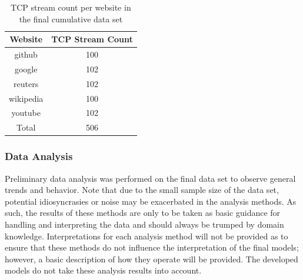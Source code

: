 \documentclass[10pt,sigconf,letterpaper,nonacm]{acmart}
\begin{document}
\begin{table}
  \caption{TCP stream count per website in the final cumulative data set}
  \label{tab:dataSize}
  \begin{tabular}{cc}
    \toprule
    Website & TCP Stream Count \\
    \midrule
    github & 100 \\
    google & 102 \\
    reuters & 102 \\
    wikipedia & 100 \\
    youtube & 102 \\
    \midrule
    Total & 506 \\
    \bottomrule
  \end{tabular}
\end{table}

\subsubsection{Data Analysis}

Preliminary data analysis was performed on the final data set to observe general trends and behavior.
Note that due to the small sample size of the data set, potential idiosyncrasies or noise may be exacerbated in the analysis methods.
As such, the results of these methods are only to be taken as basic guidance for handling and interpreting the data and should always be trumped by domain knowledge.
Interpretations for each analysis method will not be provided as to ensure that these methods do not influence the interpretation of the final models; however, a basic description of how they operate will be provided.
The developed models do not take these analysis results into account.
\end{document}
